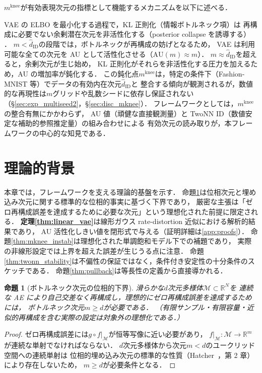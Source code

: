 \documentclass[11pt,a4paper]{jsarticle}
\newtheorem{proposition}{命題}
\newcommand{\R}{\mathbb{R}}
\newcommand{\mknee}{m^{\mathrm{knee}}}
\begin{document}
$\mknee$が有効表現次元の指標として機能するメカニズムを以下に述べる．

VAE の ELBO を最小化する過程で，KL 正則化（情報ボトルネック項）は
再構成に必要でない余剰潜在次元を非活性化する（posterior collapse を誘導する）
\cite{lucas2019elbo,higgins2017betavae}．
$m < \hat{d}_\mathrm{ID}$の段階では，ボトルネックが再構成の妨げとなるため，
VAE は利用可能な全ての次元を AU として活性化させる（$\mathrm{AU}(m) \approx m$）．
$m \approx \hat{d}_\mathrm{ID}$を超えると，余剰次元が生じ始め，
KL 正則化がそれらを非活性化する圧力を加えるため，AU の増加率が鈍化する．
この鈍化点$\mknee$は，特定の条件下（Fashion-MNIST 等）でデータの有効内在次元$\hat{d}_\mathrm{ID}$と
整合する傾向が観測されるが，数値的な再現性は$m$グリッドや乱数シードに依存し保証されない
（§\ref{sec:exp_multiseed2}，§\ref{sec:disc_mknee}）．
フレームワークとしては，$\mknee$の整合有無にかかわらず，
AU 値（頑健な直接観測量）と TwoNN ID（数値安定な補助的参照推定量）の組み合わせによる
有効次元の読み取りが，本フレームワークの中心的な知見である．

\section{理論的背景}\label{sec:theory}

本章では，フレームワークを支える理論的基盤を示す．
命題\ref{thm:lower_bound}は位相次元と埋め込み次元に関する標準的な位相的事実に基づく下界であり，
厳密な主張は「ゼロ再構成誤差を達成するために必要な次元」という理想化された前提に限定される．
\textbf{定理\ref{thm:linear_vae}}は線形ガウス rate-distortion 近似における解析的結果であり，
AU 活性化しきい値を閉形式で与える（証明詳細は\ref{app:proofs}）．
命題\ref{thm:mknee_instab}は理想化された単調飽和モデル下での補題であり，
実際の非線形設定では上界を超えた誤差が生じうる点に注意．
命題\ref{thm:twonn_stability}は不偏性の保証ではなく，条件付き安定性の十分条件のスケッチである．
命題\ref{thm:pullback}は等長性の定義から直接導かれる．

\begin{proposition}[ボトルネック次元の位相的下界]\label{thm:lower_bound}
滑らかな$d$次元多様体$\mathcal{M} \subset \R^N$を
連続な AE により自己交差なく再構成し，理想的にゼロ再構成誤差を達成するためには，
ボトルネック次元$m \geq d$が必要である．
（有限サンプル・有限容量・近似的再構成を含む実際の設定は対象外の理想化である．）
\end{proposition}

\begin{proof}
ゼロ再構成誤差には$g \circ f|_\mathcal{M}$が恒等写像に近い必要があり，
$f|_\mathcal{M}: \mathcal{M} \to \R^m$が連続な単射でなければならない．
$d$次元多様体から次元$m < d$のユークリッド空間への連続単射は
位相的埋め込み次元の標準的な性質（Hatcher~\cite{hatcher2002algebraic}，第 2 章）により存在しないため，
$m \geq d$が必要条件となる．
\end{proof}
\end{document}
